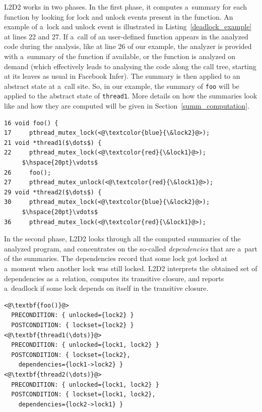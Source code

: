 \documentclass{ExcelAtFIT}
\renewcommand\vdots{%
  \vbox{\baselineskip3pt\lineskiplimit0pt\kern1pt\hbox{.}\hbox{.}\hbox{.}\kern-1pt}}
\begin{document}
L2D2 works in two phases. In the first phase, it computes a~summary for each function by looking for lock and unlock events present in the function. An example of a~lock and unlock event is illustrated in Listing~\ref{deadlock_example} at lines 22 and 27. If a~call of an user-defined function appears in the analyzed code during the analysis, like at line 26 of our example, the analyzer is provided with a~summary of the function if available, or the function is analyzed on demand (which effectively leads to analysing the code along the call tree, starting at its leaves as usual in Facebook Infer). The summary is then applied to an abstract state at a~call site. So, in our example, the summary of \texttt{foo} will be applied to the abstract state of \texttt{thread1}. More details on how the summaries look like and how they are computed will be given in Section~\ref{summ_computation}.
\begin{lstlisting}[float=tp, belowskip=-1.5 \baselineskip, caption= A~simple example capturing a~deadlock between two global locks in the C~language using the POSIX threads execution model.,
label={deadlock_example}, mathescape=true]
16 void foo() {
17     pthread_mutex_lock(<@\textcolor{blue}{\&lock2}@>);
21 void *thread1($\dots$) { 
22     pthread_mutex_lock(<@\textcolor{red}{\&lock1}@>);
     $\hspace{20pt}\vdots$
26     foo();
27     pthread_mutex_unlock(<@\textcolor{red}{\&lock1}@>);
29 void *thread2($\dots$) {
30     pthread_mutex_lock(<@\textcolor{blue}{\&lock2}@>);
     $\hspace{20pt}\vdots$
36     pthread_mutex_lock(<@\textcolor{red}{\&lock1}@>);
\end{lstlisting}

In the second phase, L2D2 looks through all the computed summaries of the analyzed program, and concentrates on the so-called \textit{dependencies} that are a~part of the summaries. The dependencies record that some lock got locked at a~moment when another lock was still locked. L2D2 interprets the obtained set of dependencies as a~relation, computes its transitive closure, and reports a~deadlock if some lock depends on itself in the transitive closure.
\begin{lstlisting}[float=tp, belowskip=-1.5 \baselineskip, label={deadlock_example_summary}, caption=Summaries of the functions in Listing~\ref{deadlock_example}]
<@\textbf{foo()}@>
  PRECONDITION: { unlocked={lock2} }
  POSTCONDITION: { lockset={lock2} }
<@\textbf{thread1(\dots)}@>
  PRECONDITION: { unlocked={lock1, lock2} }
  POSTCONDITION: { lockset={lock2}, 
    dependencies={lock1->lock2} }
<@\textbf{thread2(\dots)}@>
  PRECONDITION: { unlocked={lock1, lock2} }
  POSTCONDITION: { lockset={lock1, lock2},
    dependencies={lock2->lock1} }
\end{lstlisting}
\end{document}
